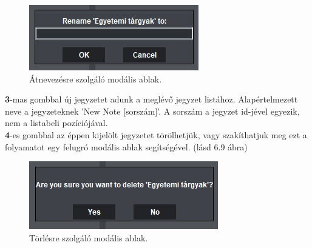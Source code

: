 \begin{figure}[h]
	\centering
	\includegraphics[scale=0.6]{images/doc_2.png}
	\caption{Átnevezésre szolgáló modális ablak.}
	\label{fig:menu_notes_rename}
\end{figure}

\vspace{5pt} \noindent \textbf{3}-mas gombbal új jegyzetet adunk a meglévő jegyzet listához. Alapértelmezett neve a jegyzeteknek ’New Note [sorszám]’. A sorszám a jegyzet id-jével egyezik, nem a listabeli pozíciójával.
\vspace{5pt} \\ \textbf{4}-es gombbal az éppen kijelölt jegyzetet törölhetjük, vagy szakíthatjuk meg ezt a folyamatot egy felugró modális ablak segítségével. (lásd 6.9 ábra)

\begin{figure}[h]
	\centering
	\includegraphics[scale=0.6]{images/doc_3.png}
	\caption{Törlésre szolgáló modális ablak.}
	\label{fig:menu_notes_delete}
\end{figure}

